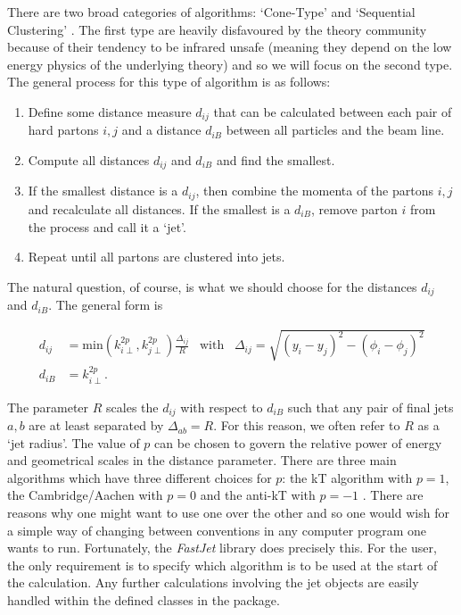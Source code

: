 There are two broad categories of algorithms: `Cone-Type' and `Sequential Clustering' \cite{Atkin2015}. The first type are heavily disfavoured by the theory community because of their tendency to be infrared unsafe (meaning they depend on the low energy physics of the underlying theory) and so we will focus on the second type. The general process for this type of algorithm is as follows:

\begin{enumerate}
\item{Define some distance measure $d_{ij}$ that can be calculated between each pair of hard partons $i,j$ and a distance $d_{iB}$ between all particles and the beam line.}
\item{Compute all distances $d_{ij}$ and $d_{iB}$ and find the smallest.}
\item{If the smallest distance is a $d_{ij}$, then combine the momenta of the partons $i, j$ and recalculate all distances. If the smallest is a $d_{iB}$, remove parton $i$ from the process and call it a `jet'.}
\item{Repeat until all partons are clustered into jets.}
\end{enumerate}

The natural question, of course, is what we should choose for the distances $d_{ij}$ and $d_{iB}$. The general form is

\begin{equation}
\begin{split}
d_{ij} &= \text{min}\left(k_{i \perp}^{2p},k_{j \perp}^{2p} \right) \frac{\Delta_{ij}}{R} \hspace{10pt} \text{with} \hspace{10pt} \Delta_{ij} = \sqrt{(y_i - y_j)^2 - (\phi_i - \phi_j)^2} \\
d_{iB} &= k_{i \perp}^{2p}.
\end{split}
\end{equation}

The parameter $R$ scales the $d_{ij}$ with respect to $d_{iB}$ such that any pair of final jets $a, b$ are at least separated by $\Delta_{ab} = R$. For this reason, we often refer to $R$ as a `jet radius'. The value of $p$ can be chosen to govern the relative power of energy and geometrical scales in the distance parameter. There are three main algorithms which have three different choices for $p$: the kT algorithm with $p =1$, the Cambridge/Aachen with $p=0$ and the anti-kT with $p = -1$ \cite{Atkin2015}. There are reasons why one might want to use one over the other and so one would wish for a simple way of changing between conventions in any computer program one wants to run. Fortunately, the \emph{FastJet} library \cite{Cacciari2012} does precisely this. For the user, the only requirement is to specify which algorithm is to be used at the start of the calculation. Any further calculations involving the jet objects are easily handled within the defined classes in the package. 

